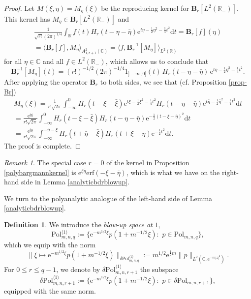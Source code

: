 \documentclass{birkart}
\theoremstyle{definition}
\newtheorem{defn}[thm]{Definition}
\theoremstyle{remark}
\newtheorem{rem}[thm]{Remark}
\numberwithin{equation}{section}
\numberwithin{figure}{section}
\newcommand{\e}{\mathrm e}
\newcommand{\1}{{\mathbf 1}}
\newcommand{\C}{{\mathbb C}}
\newcommand{\R}{{\mathbb R}}
\newcommand{\Bop}{{\mathbf B}}
\newcommand{\Fspace}{{\delta\mathrm{Pol}}}
\newcommand{\diff}{{\mathrm d}}
\begin{document}
\begin{proof}
Let $M(\xi,\eta)=M_{\eta}(\xi)$ be the reproducing kernel for 
$\Bop_r[ L^2(\R_-)]$. This kernel has $M_\eta\in\Bop_r[L^2(\R_-)]$ and
\begin{multline*}
\frac{1}{\sqrt{r!}(2\pi)^{1/4}} \int_{\R}f(t)H_r(t-\eta-\bar{\eta})
\e^{t\eta-\frac12\eta^2-\frac14t^2}\diff t
= \Bop_r[f](\eta) \\
= \langle \Bop_r[f], M_{\eta} \rangle_{A^2_{1,r+1}(\C)} = 
\langle f, \Bop_r^{-1}[M_{\eta}] \rangle_{L^2(\R)} 
\end{multline*}
for all $\eta\in\C$ and all $f\in L^2(\R_-)$, which allows us to conclude that 
\begin{equation*}
\Bop_r^{-1}[M_{\eta}](t)  
=(r!)^{-1/2}(2\pi)^{-1/4}1_{]-\infty,0]}(t)\, H_r(t-\eta-\bar{\eta})\,
\e^{t\bar\eta-\frac12\bar{\eta}^2-\frac14t^2}.
\end{equation*}
After applying the operator $\Bop_r$ to both sides, we see that (cf. 
Proposition \ref{prop-Br})
\begin{multline*}
 M_{\eta}(\xi) = \frac{1}{r!\sqrt{2\pi}} \int_{-\infty}^{0} 
H_r(t-\xi-\bar{\xi}) \e^{t \xi- \frac12\xi^2-\frac14 t^2} 
H_r(t-\eta-\bar{\eta}) \e^{t\bar{\eta}-\frac12\bar{\eta}^2-\frac14t^2} 
\diff t 
\\
=\frac{\e^{\bar{\eta} \xi}}{r! \sqrt{2\pi}} 
\int_{-\infty}^{0} H_r(t-\xi-\bar{\xi}) 
H_r(t-\eta-\bar{\eta}) \e^{-\frac{1}{2}(t - \xi - \bar{\eta})^2} 
\diff t 
\\
=\frac{\e^{\bar{\eta}\xi}}{r! \sqrt{2\pi}} \int_{-\infty}^{-\bar{\eta}-\xi} 
H_r(t + \bar{\eta} - \bar{\xi}) 
H_r(t+\xi-\eta) \e^{-\frac{1}{2}t^2} \diff t. 
\end{multline*}
The proof is complete.
\end{proof}

\begin{rem}
The special case $r=0$ of the kernel in Proposition \ref{polybargmannkernel} 
is $\e^{\xi\bar\eta}\mathrm{erf}(-\xi-\bar\eta)$, 
which is what we have on the right-hand side in Lemma \ref{analyticbdrblowup}. 
\end{rem}
\medskip

We turn to the polyanalytic analogue of the left-hand side of
Lemma \ref{analyticbdrblowup}. 

\begin{defn} We introduce the {\em blow-up space at} $1$,
\[
\mathrm{Pol}^{\langle1\rangle}_{m,n,q} := 
\big\{\e^{-{m}^{1/2}\xi}p(1+m^{-1/2}\xi):\,\, p \in \mathrm{Pol}_{m,n,q} 
\big\},
\]
which we equip with the norm 
\begin{equation*} 
\big\|\xi\mapsto \e^{-{m}^{1/2}\xi}p(1+m^{-1/2}\xi)
\big\|_{{\Fspace}^{\langle1\rangle}_{m,n,q}}:=m^{1/2}\e^{\frac12m}
\|p\|_{L^2(\C,\e^{-m|z|^2})}.
\end{equation*}
For $0\le r\le q-1$, we denote by $\Fspace^{\langle1\rangle}_{m,n,r+1}$ the 
subspace
\[
\Fspace^{\langle1\rangle}_{m,n,r+1} := 
\big\{\e^{-{m}^{1/2}\xi}p(1+m^{-1/2}\xi):\,\, p \in \Fspace_{m,n,r+1} 
\big\},
\]
equipped with the same norm.
\end{defn}
\end{document}
